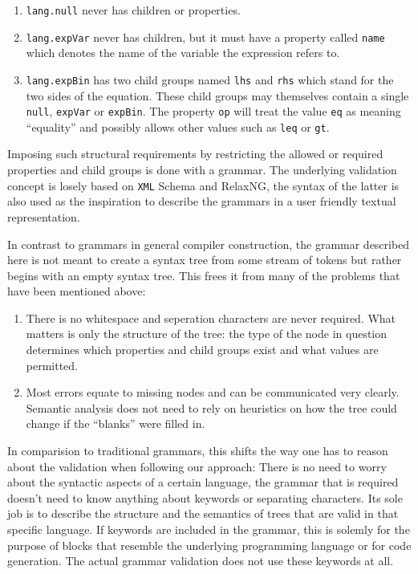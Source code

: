 \documentclass[sigconf,natbib=false]{acmart}
\newcommand{\enquote}[1]{``#1''}
\begin{document}
\begin{enumerate}
\item \label{itm:lang-exp-null} \texttt{lang.null} never has children or properties.

\item \label{itm:lang-exp-var} \texttt{lang.expVar} never has children, but it must have a property called \texttt{name} which denotes the name of the variable the expression refers to.

\item \label{itm:lang-exp-bin} \texttt{lang.expBin} has two child groups named \texttt{lhs} and \texttt{rhs} which stand for the two sides of the equation. These child groups may themselves contain a single \texttt{null}, \texttt{expVar} or \texttt{expBin}. The property \texttt{op} will treat the value \texttt{eq} as meaning \enquote{equality} and possibly allows other values such as \texttt{leq} or \texttt{gt}.
\end{enumerate}

Imposing such structural requirements by restricting the allowed or required properties and child groups is done with a grammar. The underlying validation concept is losely based on \texttt{XML} Schema and RelaxNG, the syntax of the latter is also used as the inspiration to describe the grammars in a user friendly textual representation.

In contrast to grammars in general compiler construction, the grammar described here is not meant to create a syntax tree from some stream of tokens but rather begins with an empty syntax tree. This frees it from many of the problems that have been mentioned above:

\begin{enumerate}
\item There is no whitespace and seperation characters are never required. What matters is only the structure of the tree: the type of the node in question determines which properties and child groups exist and what values are permitted.
\item Most errors equate to missing nodes and can be communicated very clearly. Semantic analysis does not need to rely on heuristics on how the tree could change if the \enquote{blanks} were filled in.
\end{enumerate}

In comparision to traditional grammars, this shifts the way one has to reason about the validation when following our approach: There is no need to worry about the syntactic aspects of a certain language, the grammar that is required doesn’t need to know anything about keywords or separating characters. Its sole job is to describe the structure and the semantics of trees that are valid in that specific language. If keywords are included in the grammar, this is solemly for the purpose of blocks that resemble the underlying programming language or for code generation. The actual grammar validation does not use these keywords at all.
\end{document}

